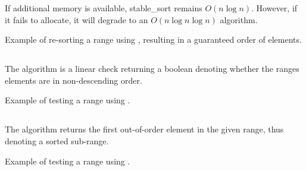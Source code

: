If additional memory is available, stable\_sort remains $O(n\log n)$. However, if it fails to allocate, it will degrade to an $O(n\log n\log n)$ algorithm.

\begin{codebox}[]{\href{https://compiler-explorer.com/z/TKx8qP8bK}{\ExternalLink}}
\footnotesize Example of re-sorting a range using , resulting in a guaranteed order of elements.
\tcblower
{}
\end{codebox}

\subsection{\texorpdfstring{}{\texttt{std::is\_sorted}}}

The  algorithm is a linear check returning a boolean denoting whether the ranges elements are in non-descending order.


\begin{codebox}[]{\href{https://compiler-explorer.com/z/T3n9bfqdM}{\ExternalLink}}
\footnotesize Example of testing a range using .
\tcblower
{}
\end{codebox}

\subsection{\texorpdfstring{}{\texttt{std::is\_sorted\_until}}}

The  algorithm returns the first out-of-order element in the given range, thus denoting a sorted sub-range.


\begin{codebox}[]{\href{https://compiler-explorer.com/z/1dvboE6b1}{\ExternalLink}}
\footnotesize Example of testing a range using .
\tcblower
{}
\end{codebox}

